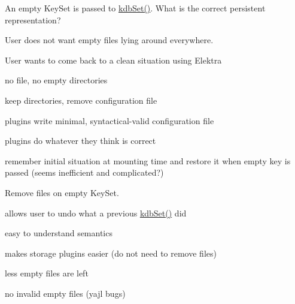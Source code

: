 An empty Key\+Set is passed to \mbox{\hyperlink{group__kdb_ga11436b058408f83d303ca5e996832bcf}{kdb\+Set()}}. What is the correct persistent representation?


\begin{DoxyItemize}
\item User does not want empty files lying around everywhere.
\item User wants to come back to a clean situation using Elektra
\end{DoxyItemize}


\begin{DoxyItemize}
\item no file, no empty directories
\item keep directories, remove configuration file
\item plugins write minimal, syntactical-\/valid configuration file
\item plugins do whatever they think is correct
\item remember initial situation at mounting time and restore it when empty key is passed (seems inefficient and complicated?)
\end{DoxyItemize}

Remove files on empty Key\+Set.


\begin{DoxyItemize}
\item allows user to undo what a previous \mbox{\hyperlink{group__kdb_ga11436b058408f83d303ca5e996832bcf}{kdb\+Set()}} did
\item easy to understand semantics
\item makes storage plugins easier (do not need to remove files)
\end{DoxyItemize}


\begin{DoxyItemize}
\item less empty files are left
\item no invalid empty files (yajl bugs)
\end{DoxyItemize}
